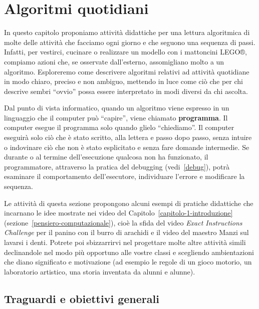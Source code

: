 \chapter{Algoritmi quotidiani}\label{algoritmi-quotidiani}

In questo capitolo proponiamo attività didattiche per una lettura algoritmica di molte delle attività che facciamo ogni giorno e che seguono una sequenza di passi. Infatti, per vestirci, cucinare o realizzare un modello con i mattoncini LEGO®, compiamo azioni che, se osservate dall'esterno, assomigliano molto a un algoritmo. Esploreremo come descrivere algoritmi relativi ad attività quotidiane in modo chiaro, preciso e non ambiguo, mettendo in luce come ciò che per chi descrive sembri ``ovvio'' possa essere interpretato in modi diversi da chi ascolta.

Dal punto di vista informatico, quando un algoritmo viene espresso in un linguaggio che il computer può ``capire'', viene chiamato \textbf{programma}. Il computer esegue il programma solo quando glielo ``chiediamo''. Il computer eseguirà solo ciò che è stato scritto, alla lettera e passo dopo passo, senza intuire o indovinare ciò che non è stato esplicitato e senza fare domande intermedie. Se durante o al termine dell'esecuzione qualcosa non ha funzionato, il programmatore, attraverso la pratica del debugging (vedi~\ref{debug}), potrà esaminare il comportamento dell'esecutore, individuare l'errore e modificare la sequenza.

Le attività di questa sezione propongono alcuni esempi di pratiche didattiche che incarnano le idee mostrate nei video del Capitolo~\ref{capitolo-1-introduzione} (sezione~\ref{pensiero-computazionale}), cioè la sfida del video \emph{Exact Instructions Challenge} per il panino con il burro di arachidi e il video del maestro Manzi sul lavarsi i denti. Potrete poi sbizzarrirvi nel progettare molte altre attività simili declinandole nel modo più opportuno alle vostre classi e scegliendo ambientazioni che diano significato e motivazione (ad esempio le regole di un gioco motorio, un laboratorio artistico, una storia inventata da alunni e alunne).

\section{Traguardi e obiettivi generali }\label{traguardi-e-obiettivi-generali}

